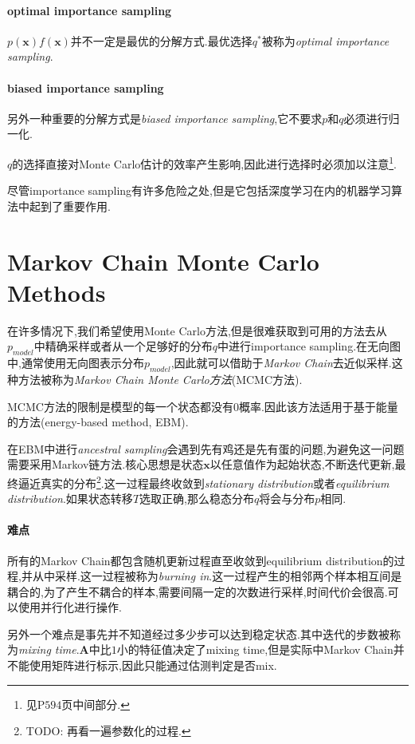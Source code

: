 \paragraph{optimal importance sampling}$p(\bm x)f(\bm x)$并不一定是最优的分解方式.最优选择$q^\ast$被称为\textit{optimal importance sampling}.

\paragraph{biased importance sampling}另外一种重要的分解方式是\textit{biased importance sampling},它不要求$p$和$q$必须进行归一化.

$q$的选择直接对Monte Carlo估计的效率产生影响,因此进行选择时必须加以注意\footnote{见P$594$页中间部分.}.

尽管importance sampling有许多危险之处,但是它包括深度学习在内的机器学习算法中起到了重要作用.

\section{Markov Chain Monte Carlo Methods}

在许多情况下,我们希望使用Monte Carlo方法,但是很难获取到可用的方法去从$p_{model}$中精确采样或者从一个足够好的分布$q$中进行importance sampling.在无向图中,通常使用无向图表示分布$p_{model}$,因此就可以借助于\textit{Markov Chain}去近似采样.这种方法被称为\textit{Markov Chain Monte Carlo方法}(MCMC方法).

MCMC方法的限制是模型的每一个状态都没有$0$概率.因此该方法适用于基于能量的方法(energy-based method, EBM).

在EBM中进行\textit{ancestral sampling}会遇到先有鸡还是先有蛋的问题,为避免这一问题需要采用Markov链方法.核心思想是状态$\bm x$以任意值作为起始状态,不断迭代更新,最终逼近真实的分布\footnote{TODO: 再看一遍参数化的过程.}.这一过程最终收敛到\textit{stationary distribution}或者\textit{equilibrium distribution}.如果状态转移$T$选取正确,那么稳态分布$q$将会与分布$p$相同.

\paragraph{难点} 所有的Markov Chain都包含随机更新过程直至收敛到equilibrium distribution的过程,并从中采样.这一过程被称为\textit{burning in}.这一过程产生的相邻两个样本相互间是耦合的,为了产生不耦合的样本,需要间隔一定的次数进行采样,时间代价会很高.可以使用并行化进行操作.

另外一个难点是事先并不知道经过多少步可以达到稳定状态.其中迭代的步数被称为\textit{mixing time}.$\bm A$中比$1$小的特征值决定了mixing time,但是实际中Markov Chain并不能使用矩阵进行标示,因此只能通过估测判定是否mix.

